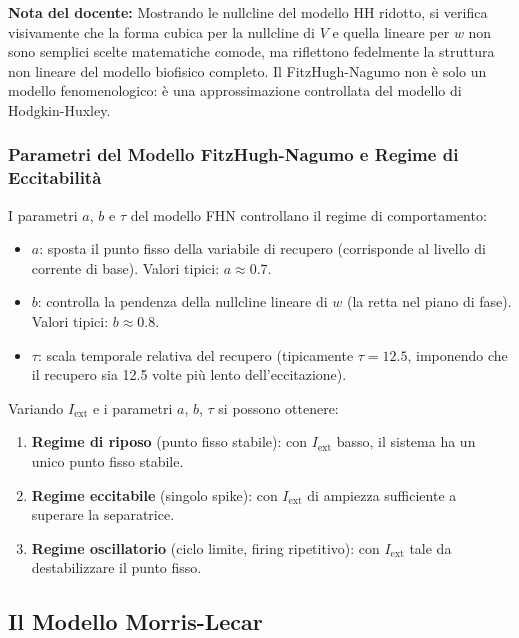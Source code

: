 \begin{tcolorbox}[colback=gray!5, colframe=gray!40, arc=2mm, boxrule=0.5pt]
\textbf{Nota del docente:} Mostrando le nullcline del modello HH ridotto, si verifica visivamente che la forma cubica per la nullcline di $V$ e quella lineare per $w$ non sono semplici scelte matematiche comode, ma riflettono fedelmente la struttura non lineare del modello biofisico completo. Il FitzHugh-Nagumo non è solo un modello fenomenologico: è una approssimazione controllata del modello di Hodgkin-Huxley.
\end{tcolorbox}

\subsubsection{Parametri del Modello FitzHugh-Nagumo e Regime di Eccitabilità}

I parametri $a$, $b$ e $\tau$ del modello FHN controllano il regime di comportamento:

\begin{itemize}
    \item \textbf{$a$}: sposta il punto fisso della variabile di recupero (corrisponde al livello di corrente di base). Valori tipici: $a \approx 0.7$.
    \item \textbf{$b$}: controlla la pendenza della nullcline lineare di $w$ (la retta nel piano di fase). Valori tipici: $b \approx 0.8$.
    \item \textbf{$\tau$}: scala temporale relativa del recupero (tipicamente $\tau = 12.5$, imponendo che il recupero sia 12.5 volte più lento dell'eccitazione).
\end{itemize}

Variando $I_{\text{ext}}$ e i parametri $a$, $b$, $\tau$ si possono ottenere:
\begin{enumerate}
    \item \textbf{Regime di riposo} (punto fisso stabile): con $I_{\text{ext}}$ basso, il sistema ha un unico punto fisso stabile.
    \item \textbf{Regime eccitabile} (singolo spike): con $I_{\text{ext}}$ di ampiezza sufficiente a superare la separatrice.
    \item \textbf{Regime oscillatorio} (ciclo limite, firing ripetitivo): con $I_{\text{ext}}$ tale da destabilizzare il punto fisso.
\end{enumerate}



\subsection{Il Modello Morris-Lecar}

